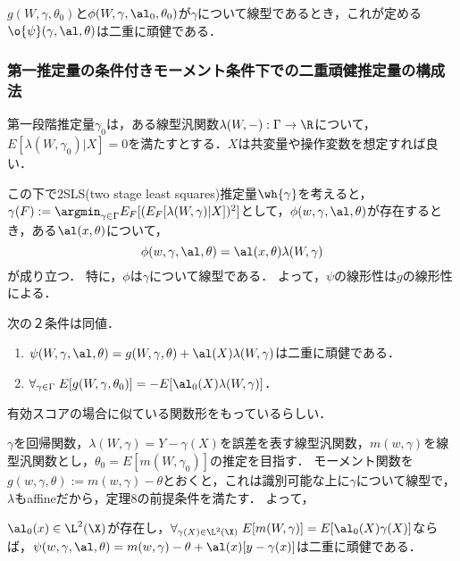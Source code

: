 \documentclass[uplatex,dvipdfmx]{jsreport}
\begin{document}
\begin{corollary}
    $g(W,\gamma,\theta_0)$と$\phi(W,\gamma,\al_0,\theta_0)$が$\gamma$について線型であるとき，これが定める$\o{\psi}(\gamma,\al,\theta)$は二重に頑健である．
\end{corollary}

\subsubsection{第一推定量の条件付きモーメント条件下での二重頑健推定量の構成法}

\begin{discussion}
    第一段階推定量$\gamma_0$は，ある線型汎関数$\lambda(W,-):\Gamma\to\R$について，
    $E[\lambda(W,\gamma_0)|X]=0$を満たすとする．$X$は共変量や操作変数を想定すれば良い．

    この下で2SLS(two stage least squares)推定量$\wh{\gamma}$を考えると，$\gamma(F):=\argmin_{\gamma\in\Gamma}E_F[(E_F[\lambda(W,\gamma)|X])^2]$として，$\phi(w,\gamma,\al,\theta)$が存在するとき，ある$\al(x,\theta)$について，
    \[\phi(w,\gamma,\al,\theta)=\al(x,\theta)\lambda(W,\gamma)\]
    が成り立つ．
    特に，$\phi$は$\gamma$について線型である．
    よって，$\psi$の線形性は$g$の線形性による．
\end{discussion}

\begin{theorem}
    次の２条件は同値．
    \begin{enumerate}
        \item $\psi(W,\gamma,\al,\theta)=g(W,\gamma,\theta)+\al(X)\lambda(W,\gamma)$は二重に頑健である．
        \item $\forall_{\gamma\in\Gamma}\;E[g(W,\gamma,\theta_0)]=-E[\al_0(X)\lambda(W,\gamma)]$．
    \end{enumerate}
\end{theorem}
\begin{remarks}
    有効スコアの場合に似ている関数形をもっているらしい．
\end{remarks}

\begin{example}
    $\gamma$を回帰関数，$\lambda(W,\gamma)=Y-\gamma(X)$を誤差を表す線型汎関数，$m(w,\gamma)$を線型汎関数とし，$\theta_0=E[m(W,\gamma_0)]$の推定を目指す．
    モーメント関数を$g(w,\gamma,\theta):=m(w,\gamma)-\theta$とおくと，これは識別可能な上に$\gamma$について線型で，
    $\lambda$もaffineだから，定理8の前提条件を満たす．
    よって，
    \begin{corollary}
        $\al_0(x)\in\L^2(\X)$が存在し，$\forall_{\gamma(X)\in\L^2(\X)}\;E[m(W,\gamma)]=E[\al_0(X)\gamma(X)]$ならば，$\psi(w,\gamma,\al,\theta)=m(w,\gamma)-\theta+\al(x)[y-\gamma(x)]$は二重に頑健である．
    \end{corollary}
\end{example}
\end{document}
